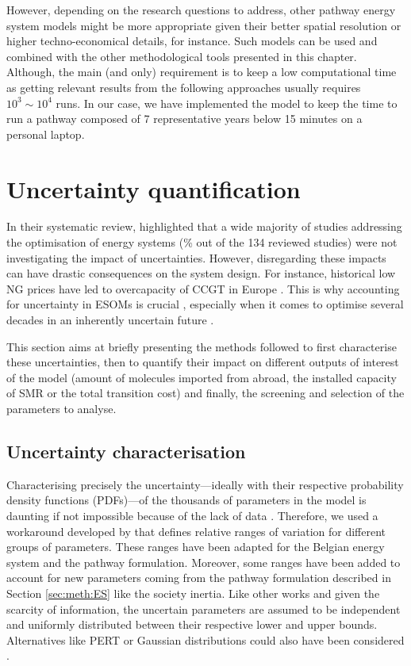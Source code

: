However, depending on the research questions to address, other pathway energy system models might be more appropriate given their better spatial resolution or higher techno-economical details, for instance. Such models can be used and combined with the other methodological tools presented in this chapter. Although, the main (and only) requirement is to keep a low computational time as getting relevant results from the following approaches usually requires $10^3\sim 10^4$ runs.  In our case, we have implemented the model to keep the time to run a pathway composed of 7 representative years below 15 minutes on a personal laptop.


\section{Uncertainty quantification}
\label{sec:meth:UQ}
In their systematic review, \citet{yue2018review} highlighted that a wide majority of studies addressing the optimisation of energy systems (\% out of the 134 reviewed studies) were not investigating the impact of uncertainties. However, disregarding these impacts can have drastic consequences on the system design. For instance, historical low \gls{NG} prices have led to overcapacity of \gls{CCGT} in Europe \cite{moret2020overcapacity}. This is why accounting for uncertainty in \gls{ESOMs} is crucial \cite{mavromatidis2018uncertainty}, especially when it comes to optimise several decades in an inherently uncertain future \cite{peace2008insights}.

This section aims at briefly presenting the methods followed to first characterise these uncertainties, then to quantify their impact on different outputs of interest of the model (\eg amount of molecules imported from abroad, the installed capacity of \gls{SMR} or the total transition cost) and finally, the screening and selection of the parameters to analyse.

\subsection{Uncertainty characterisation}
\label{subsec:uncert_charac}
Characterising precisely the uncertainty---ideally with their respective probability density functions (PDFs)---of the thousands of parameters in the model is daunting if not impossible because of the lack of data \cite{marnay2006addressing}. Therefore, we used a workaround developed by \citet{Moret2017} that defines relative ranges of variation for different groups of parameters. These ranges have been adapted for the Belgian energy system and the pathway formulation. Moreover, some ranges have been added to account for new parameters coming from the pathway formulation described in Section \ref{sec:meth:ES} like the society inertia. Like other works \cite{li2019renewables,coppitters2021robust,Moret2017PhDThesis} and given the scarcity of information, the uncertain parameters are assumed to be independent and uniformly distributed between their respective lower and upper bounds. Alternatives like PERT or Gaussian distributions could also have been considered \cite{coppittersthesis}.

